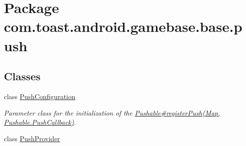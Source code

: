 \hypertarget{namespacecom_1_1toast_1_1android_1_1gamebase_1_1base_1_1push}{}\section{Package com.\+toast.\+android.\+gamebase.\+base.\+push}
\label{namespacecom_1_1toast_1_1android_1_1gamebase_1_1base_1_1push}
\subsection*{Classes}
\begin{DoxyCompactItemize}
\item 
class \hyperlink{classcom_1_1toast_1_1android_1_1gamebase_1_1base_1_1push_1_1_push_configuration}{Push\+Configuration}
\begin{DoxyCompactList}\small\item\em Parameter class for the initialization of the \hyperlink{}{Pushable\#register\+Push(\+Map, Pushable.\+Push\+Callback)}. \end{DoxyCompactList}\item 
class \hyperlink{classcom_1_1toast_1_1android_1_1gamebase_1_1base_1_1push_1_1_push_provider}{Push\+Provider}
\end{DoxyCompactItemize}
